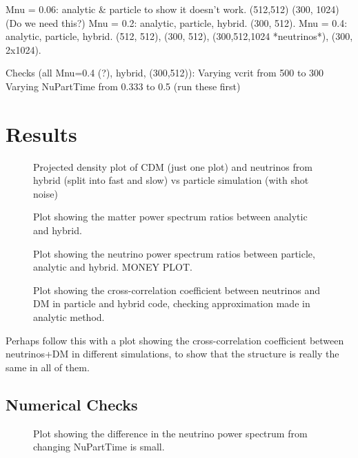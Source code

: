 \documentclass[useAMS, usenatbib]{mnras}
\begin{document}
Mnu = 0.06: analytic & particle to show it doesn't work.
(512,512) (300, 1024)
(Do we need this?)
Mnu = 0.2: analytic, particle, hybrid.
(300, 512).
Mnu = 0.4: analytic, particle, hybrid.
(512, 512), (300, 512), (300,512,1024 *neutrinos*), (300, 2x1024).

Checks (all Mnu=0.4 (?), hybrid, (300,512)):
Varying vcrit from 500 to 300
Varying NuPartTime from 0.333 to 0.5
(run these first)


\section{Results}
\label{sec:results}

\begin{figure}
  \caption{Projected density plot of CDM (just one plot) and neutrinos from hybrid (split into fast and slow) vs particle simulation (with shot noise)}
  \label{fig:density_plot}
\end{figure}

\begin{figure}
  \caption{Plot showing the matter power spectrum ratios between analytic and hybrid. }
  \label{fig:matter_power}
\end{figure}

\begin{figure}
  \caption{Plot showing the neutrino power spectrum ratios between particle, analytic and hybrid.
  MONEY PLOT.}
  \label{fig:neutrino_power}
\end{figure}

\begin{figure}
  \caption{Plot showing the cross-correlation coefficient between neutrinos
  and DM in particle and hybrid code, checking approximation made in analytic method.}
  \label{fig:cross-corr}
\end{figure}

Perhaps follow this with a plot showing the cross-correlation coefficient between neutrinos+DM
in different simulations, to show that the structure is really the same in all of them.


\subsection{Numerical Checks}

\begin{figure}
  \caption{Plot showing the difference in the neutrino power spectrum from changing NuPartTime is small. }
  \label{fig:nuparttime}
\end{figure}
\end{document}
